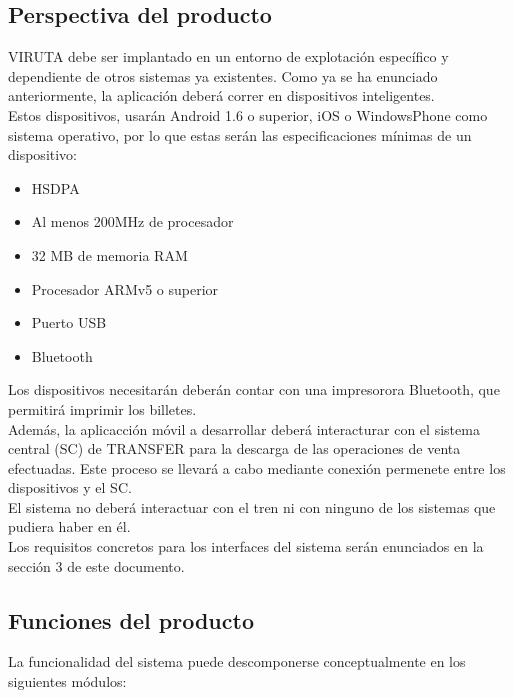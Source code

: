 \subsection{Perspectiva del producto}

VIRUTA debe ser implantado en un entorno de explotación específico y dependiente de otros sistemas ya existentes. Como ya se ha enunciado anteriormente, la aplicación deberá correr en dispositivos inteligentes.\\

Estos dispositivos, usarán Android 1.6 o superior, iOS o WindowsPhone como sistema operativo, por lo que estas serán las especificaciones mínimas de un dispositivo:

\begin{itemize}
\item HSDPA
\item Al menos 200MHz de procesador
\item 32 MB de memoria RAM
\item Procesador ARMv5 o superior 
\item Puerto USB
\item Bluetooth
\end{itemize}

Los dispositivos necesitarán deberán contar con una impresorora Bluetooth, que permitirá imprimir los billetes.\\

Además, la aplicacción móvil a desarrollar deberá interacturar con el sistema central (SC) de TRANSFER para la descarga de las operaciones de venta efectuadas. Este proceso se llevará a cabo mediante conexión permenete entre los dispositivos y el SC.\\

El sistema no deberá interactuar con el tren ni con ninguno de los sistemas que pudiera haber en él.\\

Los requisitos concretos para los interfaces del sistema serán enunciados en la sección 3 de este documento.


\subsection{Funciones del producto}

La funcionalidad del sistema puede descomponerse conceptualmente en los siguientes módulos:

